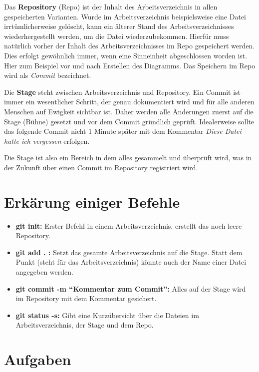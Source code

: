 \documentclass[11pt]{article}
\begin{document}
Das \textbf{Repository} (Repo) ist der Inhalt des Arbeitsverzeichnis in allen
gespeicherten Varianten. Wurde im Arbeitsverzeichnis beispielsweise
eine Datei irrtümlicherweise gelöscht, kann ein älterer Stand des
Arbeitsverzeichnisses wiederhergestellt werden, um die Datei
wiederzubekommen. Hierfür muss natürlich vorher der Inhalt des
Arbeitsverzeichnisses im Repo gespeichert werden. Dies erfolgt
gewöhnlich immer, wenn eine Sinneinheit abgeschlossen worden ist. Hier
zum Beispiel vor und nach Erstellen des Diagramms. Das Speichern im
Repo wird als \textsl{Commit} bezeichnet.

Die \textbf{Stage} steht zwischen Arbeitsverzeichnis und Repository.
Ein Commit ist immer ein wesentlicher Schritt, der genau dokumentiert
wird und für alle anderen Menschen auf Ewigkeit sichtbar ist. Daher
werden alle Änderungen zuerst auf die Stage (Bühne) gesetzt und vor
dem Commit gründlich geprüft. Idealerweise sollte das folgende Commit
nicht 1 Minute später mit dem Kommentar \textsl{Diese Datei hatte ich
  vergessen} erfolgen.

Die Stage ist also ein Bereich in dem alles gesammelt und überprüft
wird, was in der Zukunft über einen Commit im  Repository registriert wird.



\section{Erkärung einiger Befehle}
\begin{itemize}
\item \textbf{git init:} Erster Befehl in einem Arbeitsverzeichnis,
  erstellt das noch leere Repository.
\item \textbf{git add . :} Setzt das gesamte Arbeitsverzeichnis auf
  die Stage. Statt dem Punkt (steht für das Arbeitsverzeichnis) könnte
  auch der Name einer Datei angegeben werden.
\item \textbf{git commit -m \enquote{Kommentar zum Commit}:} Alles auf
  der Stage wird im Repository mit dem Kommentar gesichert.
\item \textbf{git status -s:} Gibt eine Kurzübersicht über die Dateien im Arbeitsverzeichnis, der Stage und dem Repo. 

\end{itemize}

\section{Aufgaben}
\end{document}
